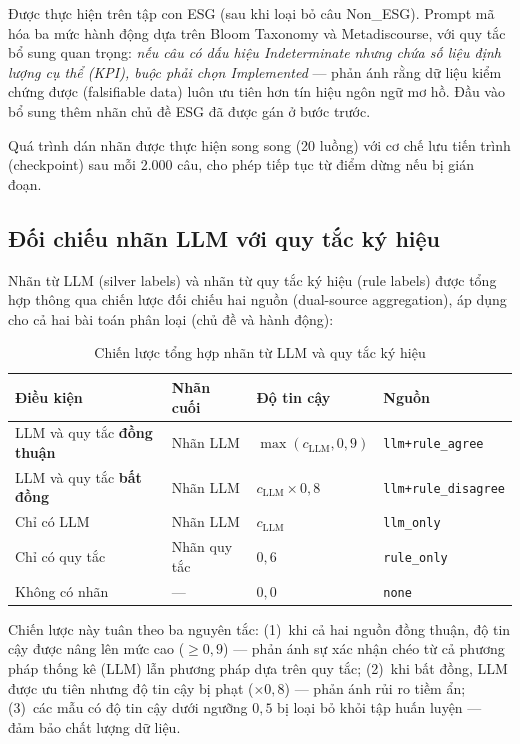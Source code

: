Được thực hiện trên tập con ESG (sau khi loại bỏ câu Non\_ESG). Prompt mã hóa ba mức hành động dựa trên Bloom Taxonomy và Metadiscourse, với quy tắc bổ sung quan trọng: \textit{nếu câu có dấu hiệu Indeterminate nhưng chứa số liệu định lượng cụ thể (KPI), buộc phải chọn Implemented} --- phản ánh rằng dữ liệu kiểm chứng được (falsifiable data) luôn ưu tiên hơn tín hiệu ngôn ngữ mơ hồ. Đầu vào bổ sung thêm nhãn chủ đề ESG đã được gán ở bước trước.

Quá trình dán nhãn được thực hiện song song (20 luồng) với cơ chế lưu tiến trình (checkpoint) sau mỗi 2.000 câu, cho phép tiếp tục từ điểm dừng nếu bị gián đoạn.


\subsection{Đối chiếu nhãn LLM với quy tắc ký hiệu}
\label{subsec:label_aggregation}

Nhãn từ LLM (silver labels) và nhãn từ quy tắc ký hiệu (rule labels) được tổng hợp thông qua chiến lược đối chiếu hai nguồn (dual-source aggregation), áp dụng cho cả hai bài toán phân loại (chủ đề và hành động):

\begin{table}[htbp]
\centering
\caption{Chiến lược tổng hợp nhãn từ LLM và quy tắc ký hiệu}
\label{tab:label_aggregation}
\small
\renewcommand{\arraystretch}{1.3}
\begin{tabular}{|p{3.5cm}|p{2.5cm}|p{3cm}|p{3cm}|}
\hline
\textbf{Điều kiện} & \textbf{Nhãn cuối} & \textbf{Độ tin cậy} & \textbf{Nguồn} \\
\hline
LLM và quy tắc \textbf{đồng thuận} & Nhãn LLM & $\max(c_{\text{LLM}}, 0{,}9)$ & \texttt{llm+rule\_agree} \\
\hline
LLM và quy tắc \textbf{bất đồng} & Nhãn LLM & $c_{\text{LLM}} \times 0{,}8$ & \texttt{llm+rule\_disagree} \\
\hline
Chỉ có LLM & Nhãn LLM & $c_{\text{LLM}}$ & \texttt{llm\_only} \\
\hline
Chỉ có quy tắc & Nhãn quy tắc & $0{,}6$ & \texttt{rule\_only} \\
\hline
Không có nhãn & --- & $0{,}0$ & \texttt{none} \\
\hline
\end{tabular}
\end{table}

Chiến lược này tuân theo ba nguyên tắc: (1)~khi cả hai nguồn đồng thuận, độ tin cậy được nâng lên mức cao ($\geq 0{,}9$) --- phản ánh sự xác nhận chéo từ cả phương pháp thống kê (LLM) lẫn phương pháp dựa trên quy tắc; (2)~khi bất đồng, LLM được ưu tiên nhưng độ tin cậy bị phạt ($\times 0{,}8$) --- phản ánh rủi ro tiềm ẩn; (3)~các mẫu có độ tin cậy dưới ngưỡng $0{,}5$ bị loại bỏ khỏi tập huấn luyện --- đảm bảo chất lượng dữ liệu.

